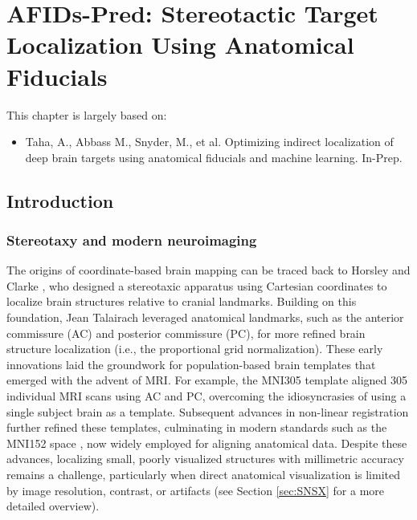 \chapter{AFIDs-Pred: Stereotactic Target Localization Using Anatomical Fiducials}\label{chap:afidspred}
\newpage
\sloppy
This chapter is largely based on:
\begin{itemize}[noitemsep,topsep=0pt]
	\item Taha, A., Abbass M., Snyder, M., et al. Optimizing indirect localization of deep brain targets using anatomical fiducials and machine learning. In-Prep.
\end{itemize}

\section{Introduction}

\subsection{Stereotaxy and modern neuroimaging}
The origins of coordinate-based brain mapping can be traced back to Horsley and Clarke \cite{Horsley1908-om}, who designed a stereotaxic apparatus using Cartesian coordinates to localize brain structures relative to cranial landmarks. Building on this foundation, Jean Talairach \cite{Schaltenbrand1977-ge, Talairach1957-eb} leveraged anatomical landmarks, such as the anterior commissure (AC) and posterior commissure (PC), for more refined brain structure localization (i.e., the proportional grid normalization). These early innovations laid the groundwork for population-based brain templates that emerged with the advent of MRI. For example, the MNI305 template \cite{Collins1994-dx} aligned 305 individual MRI scans using AC and PC, overcoming the idiosyncrasies of using a single subject brain as a template. Subsequent advances in non-linear registration further refined these templates, culminating in modern standards such as the MNI152 space \cite{Fonov2009-oi}, now widely employed for aligning anatomical data. Despite these advances, localizing small, poorly visualized structures with millimetric accuracy remains a challenge, particularly when direct anatomical visualization is limited by image resolution, contrast, or artifacts (see Section \ref{sec:SNSX} for a more detailed overview).

